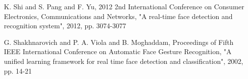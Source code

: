 \documentclass[conference]{IEEEtran}
\begin{document}
\begin{thebibliography}{00}
K. Shi and S. Pang and F. Yu, 2012 2nd International Conference on Consumer Electronics, Communications and Networks, "A real-time face detection and recognition system", 2012, pp. 3074-3077

 G. Shakhnarovich and P. A. Viola and B. Moghaddam, Proceedings of Fifth IEEE International Conference on Automatic Face Gesture Recognition, "A unified learning framework for real time face detection and classification", 2002, pp. 14-21


\fi

\end{thebibliography}
\end{document}
